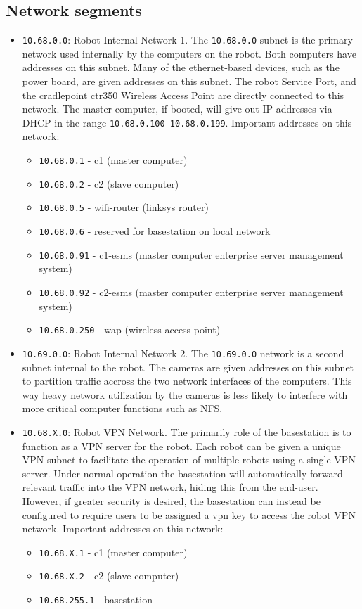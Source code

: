 \subsection{Network segments}
\begin{itemize}
\item \texttt{10.68.0.0}: Robot Internal Network 1. The
  \texttt{10.68.0.0} subnet is the primary network used internally by
  the computers on the robot.  Both computers have addresses on this
  subnet.  Many of the ethernet-based devices, such as the power
  board, are given addresses on this subnet.  The robot Service Port,
  and the cradlepoint ctr350 Wireless Access Point are directly
  connected to this network.  The master computer, if booted, will
  give out IP addresses via DHCP in the range
  \texttt{10.68.0.100-10.68.0.199}.  Important addresses on this
  network:
  \begin{itemize}
  \item \texttt{10.68.0.1} - c1 (master computer)
  \item \texttt{10.68.0.2} - c2 (slave computer)
  \item \texttt{10.68.0.5} - wifi-router (linksys router)
  \item \texttt{10.68.0.6} - reserved for basestation on local network
  \item \texttt{10.68.0.91} - c1-esms (master computer enterprise server management system)
  \item \texttt{10.68.0.92} - c2-esms (master computer enterprise server management system)
  \item \texttt{10.68.0.250} - wap (wireless access point)
  \end{itemize}
\item \texttt{10.69.0.0}: Robot Internal Network 2.  The
  \texttt{10.69.0.0} network is a second subnet internal to the robot.
  The cameras are given addresses on this subnet to partition traffic
  accross the two network interfaces of the computers.  This way heavy
  network utilization by the cameras is less likely to interfere with
  more critical computer functions such as NFS.
\item \texttt{10.68.X.0}: Robot VPN Network. The primarily role of the
  basestation is to function as a VPN server for the robot.  Each
  robot can be given a unique VPN subnet to facilitate the operation
  of multiple robots using a single VPN server.  Under normal
  operation the basestation will automatically forward relevant
  traffic into the VPN network, hiding this from the end-user.
  However, if greater security is desired, the basestation can instead
  be configured to require users to be assigned a vpn key to access
  the robot VPN network.  Important addresses on this network:
  \begin{itemize}
  \item \texttt{10.68.X.1} - c1 (master computer)
  \item \texttt{10.68.X.2} - c2 (slave computer)
  \item \texttt{10.68.255.1} - basestation
  \end{itemize}
\end{itemize}

